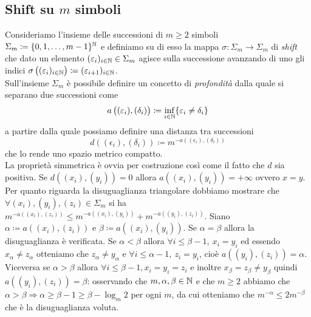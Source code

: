\subsection{Shift su $ m $ simboli}
Consideriamo l'insieme delle successioni di $ m \geq 2 $ simboli $ \Sigma_m \coloneqq \{0, 1, \ldots, m-1\}^{\mathbb{N}} $ e definiamo su di esso la mappa $ \sigma \colon \Sigma_m \to \Sigma_m $ di \emph{shift} che dato un elemento $ (\varepsilon_i)_{i \in \mathbb{N}} \in \Sigma_m $ agisce sulla successione avanzando di uno gli indici $ \sigma\left((\varepsilon_i)_{i \in \mathbb{N}}\right) \coloneqq (\varepsilon_{i + 1})_{i \in \mathbb{N}} $. \\

Sull'insieme $ \Sigma_m $ è possibile definire un concetto di \emph{profondità} dalla quale si separano due successioni come 
\[
a\left((\varepsilon_i), (\delta_i)\right) \coloneqq \inf_{i \in \mathbb{N}} \{\varepsilon_i \neq \delta_i\}
\]
a partire dalla quale possiamo definire una distanza tra successioni 
\[
d\left((\epsilon_i), (\delta_i)\right) \coloneqq m^{-a\left((\epsilon_i), (\delta_i)\right)}
\]
che lo rende uno spazio metrico compatto. \\

La proprietà simmetrica è ovvia per costruzione così come il fatto che $ d $ sia positiva. Se $ d((x_i), (y_i)) = 0 $ allora $ a((x_i), (y_i)) = +\infty $ ovvero $ x = y $. Per quanto riguarda la disuguaglianza triangolare dobbiamo mostrare che $ \forall (x_i), (y_i), (z_i) \in \Sigma_m $ si ha $ m^{-a((x_i),(z_i))} \leq m^{-a((x_i), (y_i))} + m^{-a((y_i), (z_i))} $. Siano $ \alpha \coloneqq a((x_i), (z_i)) $ e $ \beta \coloneqq a((x_i), (y_i)) $. Se $ \alpha = \beta $ allora la disuguaglianza è verificata. Se $ \alpha < \beta $ allora $ \forall i \leq \beta-1, \ x_i = y_i $ ed essendo $ x_\alpha \neq z_\alpha $ otteniamo che $ z_\alpha \neq y_\alpha $ e $ \forall i \leq \alpha-1, \ z_i = y_i $, cioè $ a((y_i), (z_i)) = \alpha $. Viceversa se $ \alpha > \beta $ allora $ \forall i \leq \beta-1, x_i=y_i=z_i $ e inoltre $ x_\beta=z_\beta \neq y_\beta $ quindi $ a((y_i), (z_i)) = \beta $: osservando che $ m, \alpha, \beta \in \mathbb{N} $ e che $ m \geq 2 $ abbiamo che $ \alpha > \beta \Rightarrow \alpha \geq \beta - 1 \geq \beta - \log_m 2 $ per ogni $ m $, da cui otteniamo che $ m^{-\alpha} \leq 2m^{-\beta} $ che è la disuguaglianza voluta. \\

